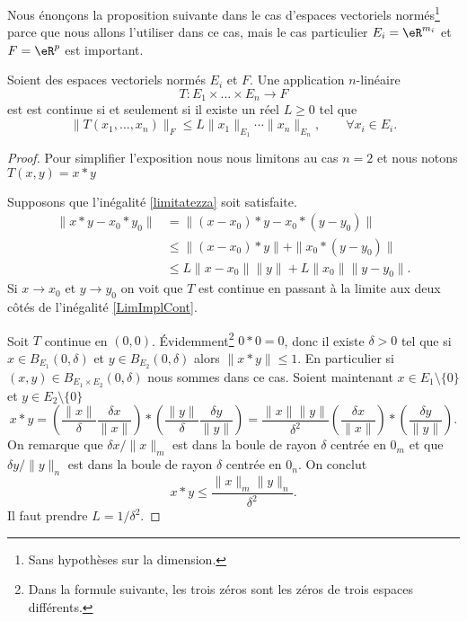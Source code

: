 Nous énonçons la proposition suivante dans le cas d'espaces vectoriels normés\footnote{Sans hypothèses sur la dimension.} parce que nous allons l'utiliser dans ce cas, mais le cas particulier \( E_i=\eR^{m_i}\) et \( F=\eR^p\) est important.
\begin{proposition} \label{PropUADlSMg}
	Soient des espaces vectoriels normés \( E_i\) et \( F\). Une application \( n\)-linéaire
	\begin{equation}
		T\colon E_1\times\ldots\times E_n\to F
	\end{equation}
	est est continue si et seulement si il existe un réel \( L\geq 0\) tel que
	\begin{equation}\label{limitatezza}
		\|T(x_1, \ldots,x_n)\|_F\leq L \|x_1\|_{E_1}\cdots\|x_n\|_{E_n}, \qquad \forall x_i\in E_i.
	\end{equation}
\end{proposition}

\begin{proof}
	Pour simplifier l'exposition nous nous limitons au cas \( n=2\) et nous notons \( T(x,y)=x*y\)

	Supposons que l'inégalité \eqref{limitatezza} soit satisfaite.
	\begin{equation}\label{LimImplCont}
		\begin{aligned}
			\|x*y-x_0*y_0\| & =\|(x-x_0)*y-x_0*(y-y_0)\|                \\
			                & \leq \|(x-x_0)*y\|+\|x_0*(y-y_0)\|        \\
			                & \leq L\|x-x_0\|\|y\| + L\|x_0\|\|y-y_0\|.
		\end{aligned}
	\end{equation}
	Si \( x\to x_0\) et \( y\to y_0\)  on voit que \( T\) est continue en passant à la limite aux deux côtés de l'inégalité \eqref{LimImplCont}.

	Soit \( T\) continue en \( (0,0)\). Évidemment\footnote{Dans la formule suivante, les trois zéros sont les zéros de trois espaces différents.} \( 0*0=0\), donc il existe \( \delta>0\) tel que si \( x\in B_{E_1}(0,\delta)\) et \( y\in B_{E_2}(0,\delta)\) alors \( \|x*y\|\leq 1\). En particulier si \( (x,y)\in B_{E_1\times E_2}(0,\delta)\) nous sommes dans ce cas. Soient maintenant  \( x\in E_1\setminus\{ 0 \}\)  et \( y\in E_2\setminus\{ 0\}\)
	\begin{equation}
		x*y =\left(\frac{\|x\|}{\delta}\frac{\delta x}{\|x\|}\right)*\left(\frac{\|y\|}{\delta}\frac{\delta y}{\|y\|}\right)
		=\frac{\|x\|\|y\|}{\delta^2} \left(\frac{\delta x}{\|x\|}\right)*\left(\frac{\delta y}{\|y\|}\right).
	\end{equation}
	On remarque que \( \delta x/\|x\|_m\) est dans la boule de rayon \( \delta\) centrée en \( 0_m\) et que \( \delta y/\|y\|_n\) est dans la boule de rayon \( \delta\) centrée en \( 0_n\). On conclut
	\[
		x*y\leq \frac{\|x\|_m\|y\|_n}{\delta^2}.
	\]
	Il faut prendre \( L=1/\delta^2\).
\end{proof}

